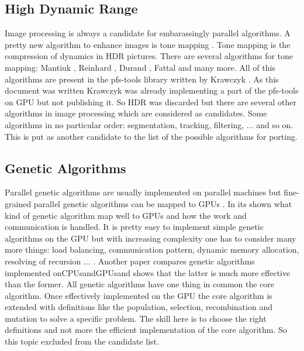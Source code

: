 \subsection{High Dynamic Range} %
\label{par:high_dynamic_range}
Image processing is always a candidate for embarassingly parallel algorithms. A
pretty new algorithm to enhance images is tone mapping
\citep{citeulike:3783303}. Tone mapping is the compression of dynamics in
\gls{HDR} pictures. There are several algorithms for tone mapping: Mantiuk
\citep{citeulike:3783315}, Reinhard \citep{citeulike:3783311}, Durand
\citep{citeulike:789299}, Fattal \citep{citeulike:3783313} and many more. All of
this algorithms are present in the pfs-tools library written by Krawczyk
\citep{citeulike:3783303}. As this document was written Krawczyk was already
implementing a part of the pfs-tools on \gls{GPU} but not publishing it. 
So \gls{HDR} was discarded but there are several other algorithms in image
processing which are considered as candidates. Some algorithms in no particular
order: segmentation, tracking, filtering, ... and so on. This is put as another
candidate to the list of the possible algorithms for porting.

\subsection{Genetic Algorithms} %
\label{par:genetic_algorithms}
Parallel genetic algorithms are usually implemented on parallel machines but
fine-grained parallel genetic algorithms can be mapped to \glspl{GPU}
\citep{citeulike:3801879}. In \citep{citeulike:3801866} its shown what kind of
genetic algorithm map well to \glspl{GPU} and how the work and communication is
handled. It is pretty easy to implement simple genetic algorithms on the
\gls{GPU} but with increasing complexity one has to consider many more things: load
balancing, communication pattern, dynamic memory allocation, resolving of
recursion ... . Another paper \citep{citeulike:3801883} compares genetic
algorithms implemented on\glspl{CPU}and\glspl{GPU}and shows that the latter is much more
effective than the former. All genetic algorithms have one thing in common the
core algorithm. Once effectively implemented on the \gls{GPU} the core algorithm is
extended with definitions like the population, selection, recombination and
mutation to solve a specific problem. The skill here is to choose the right
definitions and not more the efficient implementation of the core algorithm. So
this topic excluded from the candidate list.

